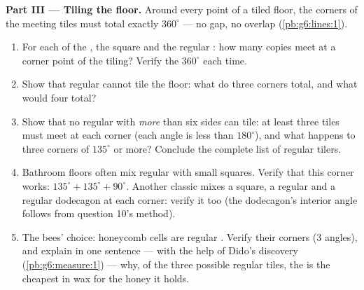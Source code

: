 \begin{problem}
\medskip
\noindent\textbf{Part III --- Tiling the floor.}
Around every point of a tiled floor, the corners of the meeting
tiles must total exactly $360^\circ$ --- no gap, no overlap
(\cref{pb:g6:lines:1}).
\begin{enumerate}[resume]
  \item For each of the , the square and the
        regular : how many copies meet at a corner point
        of the tiling? Verify the $360^\circ$ each time.
  \item Show that regular  cannot tile the floor: what
        do three corners total, and what would four total?
  \item Show that no regular  with \emph{more} than six
        sides can tile: at least three tiles must meet at each
        corner (each angle is less than $180^\circ$), and what
        happens to three corners of $135^\circ$ or more? Conclude
        the complete list of regular tilers.
  \item Bathroom floors often mix regular  with small
        squares. Verify that this corner works:
        $135^\circ + 135^\circ + 90^\circ$. Another classic mixes
        a square, a regular  and a regular dodecagon at
        each corner: verify it too (the dodecagon's interior
        angle follows from question 10's method).
  \item The bees' choice: honeycomb cells are regular .
        Verify their corners ($3$ angles), and explain in one
        sentence --- with the help of Dido's discovery
        (\cref{pb:g6:measure:1}) --- why, of the three possible
        regular tiles, the  is the cheapest in wax for
        the honey it holds.
\end{enumerate}
\end{problem}
